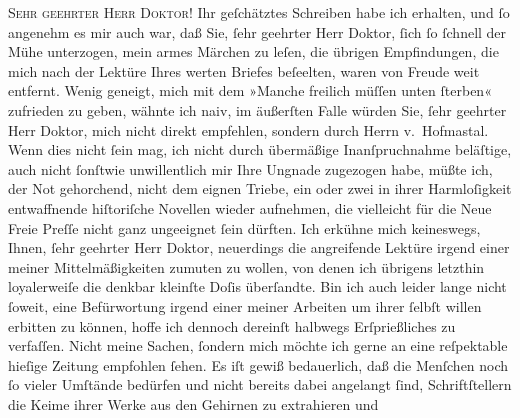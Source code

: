 \pstart{}\textsc{Sehr geehrter Herr Doktor!}\pend\vspace{0.5em}
\pstart
           Ihr geſchätztes Schreiben habe ich erhalten, und{ }ſo angenehm es mir auch war, daß
               Sie,{ }ſehr geehrter Herr Doktor,{ }ſich{ }ſo{ }ſchnell der Mühe unterzogen, mein armes Märchen zu leſen, die übrigen
               Empfindungen, die mich nach der Lektüre Ihres werten Briefes beſeelten, waren von
               Freude weit entfernt. Wenig geneigt, mich mit dem »Manche freilich müſſen unten{ }ſterben« zufrieden zu geben,
               wähnte ich naiv, im äußerſten Falle würden Sie,{ }ſehr geehrter Herr Doktor, mich nicht
               direkt empfehlen, sondern durch Herrn v. Hofma{\geminationn}stal. Wenn dies nicht{ }ſein mag, ich nicht durch
               übermäßige Inanſpruchnahme beläſtige, auch nicht {\pb}ſonſtwie unwillentlich mir Ihre Ungnade
               zugezogen habe, müßte ich, der Not gehorchend, nicht dem eignen Triebe, ein oder zwei
               in ihrer Harmloſigkeit entwaffnende hiſtoriſche Novellen wieder aufnehmen, die
               vielleicht für die Neue Freie Preſſe nicht ganz
               ungeeignet{ }ſein dürften. Ich erkühne mich keineswegs, Ihnen,{ }ſehr geehrter Herr
               Doktor, neuerdings die angreifende Lektüre irgend einer meiner Mittelmäßigkeiten
               zumuten zu wollen, von denen ich übrigens letzthin loyalerweiſe die denkbar kleinſte
               Doſis überſandte. Bin ich auch leider lange nicht{ }ſoweit, eine Befürwortung irgend
               einer meiner Arbeiten um ihrer{ }ſelbſt willen erbitten zu können, hoffe ich dennoch
               dereinſt halbwegs Erſprießliches zu verfaſſen. Nicht meine Sachen, {\pb}ſondern mich möchte ich gerne an eine
               reſpektable hieſige Zeitung empfohlen{ }ſehen. Es iſt gewiß bedauerlich, daß die
               Menſchen noch{ }ſo vieler Umſtände bedürfen und nicht bereits dabei angelangt{ }ſind,
               Schriftſtellern die Keime ihrer Werke aus den Gehirnen zu extrahieren und
